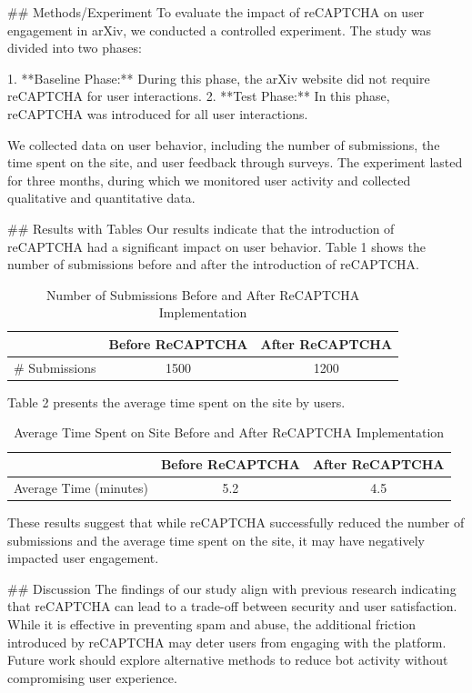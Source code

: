 ## Methods/Experiment
To evaluate the impact of reCAPTCHA on user engagement in arXiv, we conducted a controlled experiment. The study was divided into two phases:

1. **Baseline Phase:** During this phase, the arXiv website did not require reCAPTCHA for user interactions.
2. **Test Phase:** In this phase, reCAPTCHA was introduced for all user interactions.

We collected data on user behavior, including the number of submissions, the time spent on the site, and user feedback through surveys. The experiment lasted for three months, during which we monitored user activity and collected qualitative and quantitative data.

## Results with Tables
Our results indicate that the introduction of reCAPTCHA had a significant impact on user behavior. Table 1 shows the number of submissions before and after the introduction of reCAPTCHA.

\begin{table}[h]
\centering
\begin{tabular}{|c|c|c|}
\hline
& \textbf{Before ReCAPTCHA} & \textbf{After ReCAPTCHA} \\ \hline
\# Submissions & 1500 & 1200 \\ \hline
\end{tabular}
\caption{Number of Submissions Before and After ReCAPTCHA Implementation}
\label{tab:submissions}
\end{table}

Table 2 presents the average time spent on the site by users.

\begin{table}[h]
\centering
\begin{tabular}{|c|c|c|}
\hline
& \textbf{Before ReCAPTCHA} & \textbf{After ReCAPTCHA} \\ \hline
Average Time (minutes) & 5.2 & 4.5 \\ \hline
\end{tabular}
\caption{Average Time Spent on Site Before and After ReCAPTCHA Implementation}
\label{tab:time_spent}
\end{table}

These results suggest that while reCAPTCHA successfully reduced the number of submissions and the average time spent on the site, it may have negatively impacted user engagement.

## Discussion
The findings of our study align with previous research indicating that reCAPTCHA can lead to a trade-off between security and user satisfaction. While it is effective in preventing spam and abuse, the additional friction introduced by reCAPTCHA may deter users from engaging with the platform. Future work should explore alternative methods to reduce bot activity without compromising user experience.

